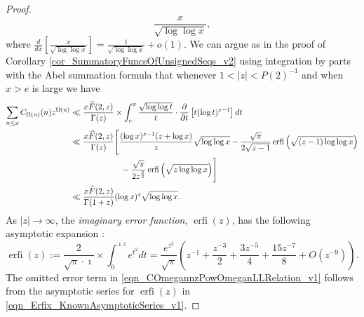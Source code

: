 \documentclass[11pt,reqno,a4letter]{article}
\numberwithin{figure}{section}
\numberwithin{table}{section}
\theoremstyle{plain}
\numberwithin{theorem}{section}
\theoremstyle{definition}
\begin{document}
\begin{proof}
\[     \frac{x}{\sqrt{\log\log x}}, 
\]
where $\frac{d}{dx}\left[\frac{x}{\sqrt{\log\log x}}\right] = \frac{1}{\sqrt{\log\log x}} + o(1)$. 
We can argue as in the proof of Corollary \ref{cor_SummatoryFuncsOfUnsignedSeqs_v2} 
using integration by parts with the Abel summation formula that whenever $1 < |z| < P(2)^{-1}$ 
and when $x > e$ is large we have 
\begin{align}
\notag
\sum_{n \leq x} C_{\Omega(n)}(n) z^{\Omega(n)} & \ll \frac{x \widehat{F}(2, z)}{\Gamma(z)} \times 
     \int_e^{x} \frac{\sqrt{\log\log t}}{t} \cdot 
     \frac{\partial}{\partial t}\left[ t (\log t)^{z-1}\right] dt \\ 
\notag 
     & \ll 
     \frac{x \widehat{F}(2, z)}{\Gamma(z)} \Biggl[
     \frac{(\log x)^{z-1}(z+\log x)}{z} \sqrt{\log\log x} - 
     \frac{\sqrt{\pi}}{2\sqrt{z-1}} \operatorname{erfi}\left(\sqrt{(z-1)\log\log x}\right) \\ 
\notag
     & \phantom{\ll\Biggl[\qquad\qquad\ } - 
     \frac{\sqrt{\pi}}{2 z^{\frac{3}{2}}} \operatorname{erfi}\left(\sqrt{z \log\log x}\right) 
     \Biggr] \\ 
\label{eqn_COmegannzPowOmeganLLRelation_v1} 
     & \ll \frac{x \widehat{F}(2, z)}{\Gamma(1+z)} (\log x)^{z} \sqrt{\log\log x}. 
\end{align}
As $|z| \rightarrow \infty$, the \emph{imaginary error function}, 
$\operatorname{erfi}(z)$, has the following asymptotic expansion 
\cite[\S 7.12]{NISTHB}: 
\begin{equation}
\label{eqn_Erfix_KnownAsymptoticSeries_v1}
\operatorname{erfi}(z) := \frac{2}{\sqrt{\pi} \cdot \imath} \times \int_0^{\imath z} e^{t^2} dt = 
     \frac{e^{z^2}}{\sqrt{\pi}} \left(z^{-1} + \frac{z^{-3}}{2} + 
     \frac{3z^{-5}}{4} + \frac{15 z^{-7}}{8} + O\left(z^{-9}\right)\right). 
\end{equation}
The omitted error term in 
\eqref{eqn_COmegannzPowOmeganLLRelation_v1} 
follows from the asymptotic series for 
$\operatorname{erfi}(z)$ in \eqref{eqn_Erfix_KnownAsymptoticSeries_v1}. 



\end{proof}
\end{document}
